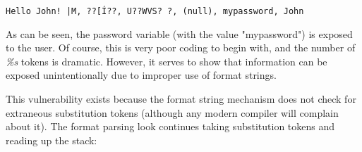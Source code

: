 \vgap
\begin{lstlisting}[frame=single]
Hello John! |M, ??[Í??, U??WVS? ?, (null), mypassword, John
\end{lstlisting}

As can be seen, the password variable (with the value "mypassword") is exposed to the user. Of course, this is very poor coding to begin with, and the number of \textit{\%s} tokens is dramatic. However, it serves to show that information can be exposed unintentionally due to improper use of format strings.

This vulnerability exists because the format string mechanism does not check for extraneous substitution tokens (although any modern compiler will complain about it). The format parsing look continues taking substitution tokens and reading up the stack:




